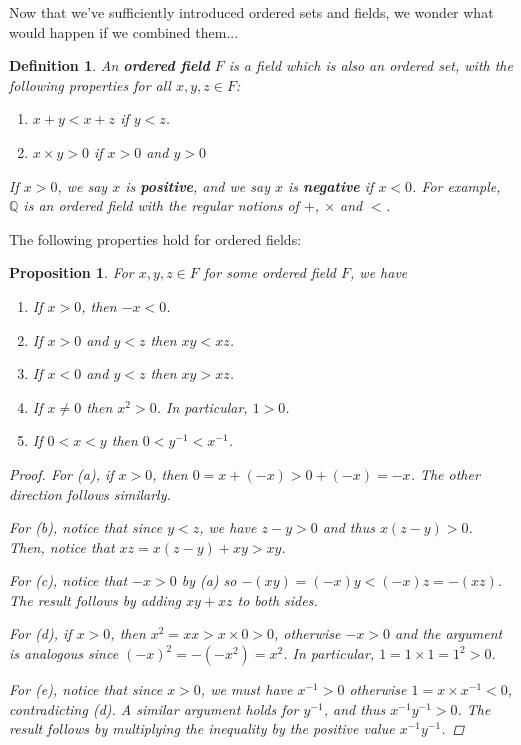 \documentclass{scrbook}
\newcommand{\Q}{\mathbb{Q}}
\newtheorem{proposition}{Proposition}
\newtheorem{definition}{Definition}
\begin{document}
Now that we've sufficiently introduced ordered sets and fields, we wonder what would happen if we combined them...

\begin{definition}
An \textbf{ordered field} $F$ is a field which is also an ordered set, with the following properties for all $x, y, z \in F$:
\begin{enumerate}
\item $x + y < x + z$ if $y < z$.
\item $x \times y > 0$ if $x > 0$ and $y > 0$
\end{enumerate}

If $x > 0$, we say $x$ is \textbf{positive}, and we say $x$ is \textbf{negative} if $x < 0$. For example, $\Q$ is an ordered field with the regular notions of $+$, $\times$ and $<$. 
\end{definition}

The following properties hold for ordered fields:
\begin{proposition}
For $x, y, z \in F$ for some ordered field $F$, we have
\begin{enumerate}
\item If $x > 0$, then $-x < 0$.
\item If $x > 0$ and $y < z$ then $xy < xz$.
\item If $x < 0$ and $y < z$ then $xy > xz$.
\item If $x \ne 0$ then $x^2 > 0$. In particular, $1 > 0$.
\item If $0 < x < y$ then $0 < y^{-1} < x^{-1}$. 
\end{enumerate}
\begin{proof}
For (a), if $x > 0$, then $0 = x + (-x) > 0 + (-x) = -x$. The other direction follows similarly. 

For (b), notice that since $y < z$, we have $z - y > 0$ and thus $x (z - y) > 0$. Then, notice that $xz = x (z - y) + xy > xy$. 

For (c), notice that $-x > 0$ by (a) so $-(xy) = (-x)y < (-x)z = -(xz)$. The result follows by adding $xy + xz$ to both sides.

For (d), if $x > 0$, then $x^2 = xx > x \times 0 > 0$, otherwise $-x > 0$ and the argument is analogous since $(-x)^2 = -(-x^2) = x^2$. In particular, $1 = 1 \times 1 = 1^2 > 0$. 

For (e), notice that since $x > 0$, we must have $x^{-1} > 0$ otherwise $1 = x \times x^{-1} < 0$, contradicting (d). A similar argument holds for $y^{-1}$, and thus $x^{-1}y^{-1} > 0$. The result follows by multiplying the inequality by the positive value $x^{-1}y^{-1}$. 
\end{proof}
\end{proposition}
\end{document}
